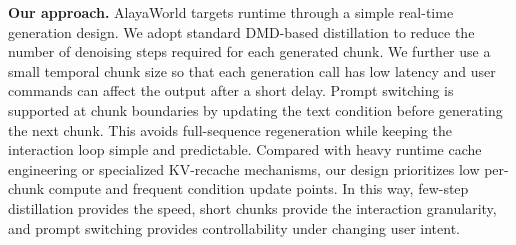 \textbf{Our approach.}
AlayaWorld targets runtime through a simple real-time generation design.
We adopt standard DMD-based distillation to reduce the number of denoising steps required for each generated chunk.
We further use a small temporal chunk size so that each generation call has low latency and user commands can affect the output after a short delay.
Prompt switching is supported at chunk boundaries by updating the text condition before generating the next chunk.
This avoids full-sequence regeneration while keeping the interaction loop simple and predictable.
Compared with heavy runtime cache engineering or specialized KV-recache mechanisms, our design prioritizes low per-chunk compute and frequent condition update points.
In this way, few-step distillation provides the speed, short chunks provide the interaction granularity, and prompt switching provides controllability under changing user intent.